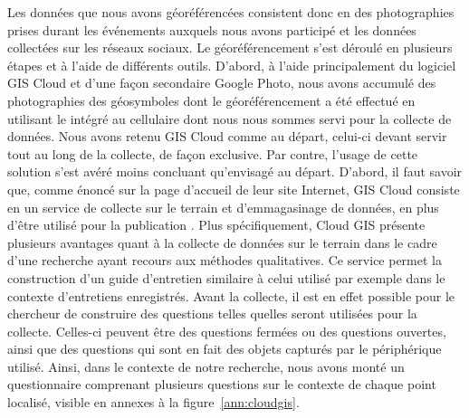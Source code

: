 Les données que nous avons géoréférencées consistent donc en des photographies prises durant les événements \lgbt{} auxquels nous avons participé et les données collectées sur les réseaux sociaux.
Le géoréférencement s'est déroulé en plusieurs étapes et à l'aide de différents outils.
D'abord, à l'aide principalement du logiciel GIS Cloud et d'une façon secondaire Google Photo, nous avons accumulé des photographies des géosymboles dont le géoréférencement a été effectué en utilisant le \gps{} intégré au cellulaire dont nous nous sommes servi pour la collecte de données.
Nous avons retenu GIS Cloud comme au départ, celui-ci devant servir tout au long de la collecte, de façon exclusive.
Par contre, l'usage de cette solution s'est avéré moins concluant qu'envisagé au départ.
D'abord, il faut savoir que, comme énoncé sur la page d'accueil de leur site Internet, GIS Cloud consiste en un service de collecte sur le terrain et d’emmagasinage de données, en plus d'être utilisé pour la publication \citep{Cloud2014}.
Plus spécifiquement, Cloud GIS présente plusieurs avantages quant à la collecte de données sur le terrain dans le cadre d'une recherche ayant recours aux méthodes qualitatives.
Ce service permet la construction d'un guide d'entretien similaire à celui utilisé par exemple dans le contexte d'entretiens enregistrés.
Avant la collecte, il est en effet possible pour le chercheur de construire des questions telles quelles seront utilisées pour la collecte.
Celles-ci peuvent être des questions fermées ou des questions ouvertes, ainsi que des questions qui sont en fait des objets capturés par le périphérique utilisé.
Ainsi, dans le contexte de notre recherche, nous avons monté un questionnaire comprenant plusieurs questions sur le contexte de chaque point localisé, visible en annexes à la figure~\ref{ann:cloudgis}.

